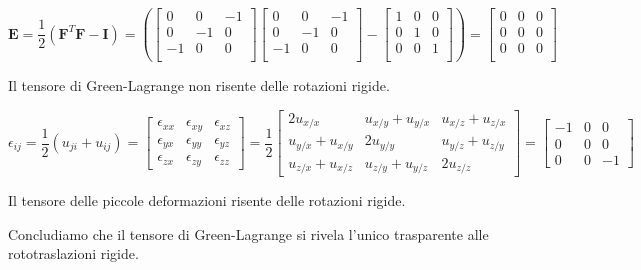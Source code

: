  \begin{equation*}
\boldsymbol{E} = \frac{1}{2} \left(\boldsymbol{F}^T \boldsymbol{F} - \boldsymbol{I}\right)
= \left(\begin{bmatrix}
   0 & 0 & -1 \\
   0 & -1 & 0 \\
   -1 & 0 & 0 \\
\end{bmatrix} 
\begin{bmatrix}
   0 & 0 & -1 \\
   0 & -1 & 0 \\
   -1 & 0 & 0 \\
\end{bmatrix} -
\begin{bmatrix}
   1 & 0 & 0 \\
   0 & 1 & 0 \\
   0 & 0 & 1 \\
\end{bmatrix}\right) =
\begin{bmatrix}
   0 & 0 & 0 \\
   0 & 0 & 0 \\
   0 & 0 & 0 \\
\end{bmatrix}
\end{equation*}

Il tensore di Green-Lagrange non risente delle rotazioni rigide.

\begin{equation*}
\epsilon_{ij} = \frac{1}{2} \left( u_{ji} + u_{ij} \right)
= 
\begin{bmatrix}
\epsilon_{xx} & \epsilon_{xy} & \epsilon_{xz} \\
\epsilon_{yx} & \epsilon_{yy} & \epsilon_{yz} \\
\epsilon_{zx} & \epsilon_{zy} & \epsilon_{zz}
\end{bmatrix}
= 
\frac{1}{2}
\begin{bmatrix}
2 u_{x/x} & u_{x/y} + u_{y/x} & u_{x/z} + u_{z/x} \\
u_{y/x} + u_{x/y} & 2 u_{y/y} & u_{y/z} + u_{z/y} \\
u_{z/x} + u_{x/z} & u_{z/y} + u_{y/z} & 2 u_{z/z}
\end{bmatrix}
=
\begin{bmatrix}
-1 & 0 & 0 \\
0 & 0 & 0 \\
0 & 0 & -1
\end{bmatrix}
\end{equation*}

Il tensore delle piccole deformazioni risente delle rotazioni rigide.





Concludiamo che il tensore di Green-Lagrange si rivela l'unico trasparente alle rototraslazioni rigide.